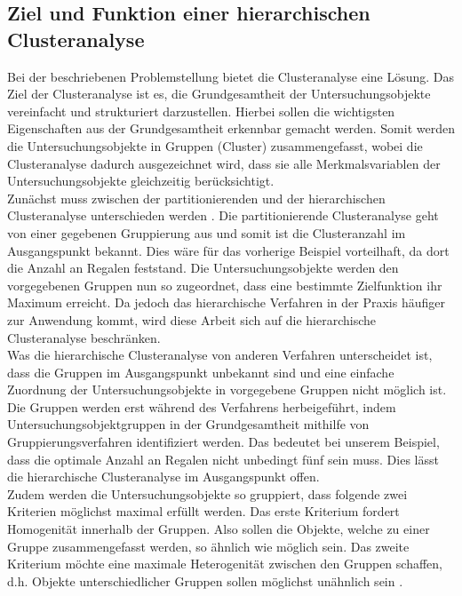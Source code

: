 \documentclass[12pt,titlepage]{article}
\begin{document}
		\subsection{Ziel und Funktion einer hierarchischen Clusteranalyse}
			Bei der beschriebenen Problemstellung bietet die Clusteranalyse eine Lösung. Das Ziel der Clusteranalyse ist es, die Grundgesamtheit der Untersuchungsobjekte vereinfacht und strukturiert darzustellen. Hierbei sollen die wichtigsten Eigenschaften aus der Grundgesamtheit erkennbar gemacht werden. Somit werden die Untersuchungsobjekte in Gruppen (Cluster) zusammengefasst, wobei die Clusteranalyse dadurch ausgezeichnet wird, dass sie alle Merkmalsvariablen der Untersuchungsobjekte gleichzeitig berücksichtigt. \\
Zunächst muss zwischen der partitionierenden und der hierarchischen Clusteranalyse unterschieden werden \cite[S. 476]{Backhaus2015} . Die partitionierende Clusteranalyse geht von einer gegebenen Gruppierung aus und somit ist die Clusteranzahl im Ausgangspunkt bekannt. Dies wäre für das vorherige Beispiel vorteilhaft, da dort die Anzahl an Regalen feststand. Die Untersuchungsobjekte werden den vorgegebenen Gruppen nun so zugeordnet, dass eine bestimmte Zielfunktion ihr Maximum erreicht. Da jedoch das hierarchische Verfahren in der Praxis häufiger zur Anwendung kommt, wird diese Arbeit sich auf die hierarchische Clusteranalyse beschränken. \\
Was die hierarchische Clusteranalyse von anderen Verfahren unterscheidet ist, dass die Gruppen im Ausgangspunkt unbekannt sind und eine einfache Zuordnung der Untersuchungsobjekte in vorgegebene Gruppen nicht möglich ist. Die Gruppen werden erst während des Verfahrens herbeigeführt, indem Untersuchungsobjektgruppen in der Grundgesamtheit mithilfe von Gruppierungsverfahren identifiziert werden. Das bedeutet bei unserem Beispiel, dass die optimale Anzahl an Regalen nicht unbedingt fünf sein muss. Dies lässt die hierarchische Clusteranalyse im Ausgangspunkt offen. \\
Zudem werden die Untersuchungsobjekte so gruppiert, dass folgende zwei Kriterien möglichst maximal erfüllt werden. Das erste Kriterium fordert Homogenität innerhalb der Gruppen. Also sollen die Objekte, welche zu einer Gruppe zusammengefasst werden, so ähnlich wie möglich sein. Das zweite Kriterium möchte eine maximale Heterogenität zwischen den Gruppen schaffen, d.h. Objekte unterschiedlicher Gruppen sollen möglichst unähnlich sein \cite[S. 443]{Hartung2007}.
\end{document}
